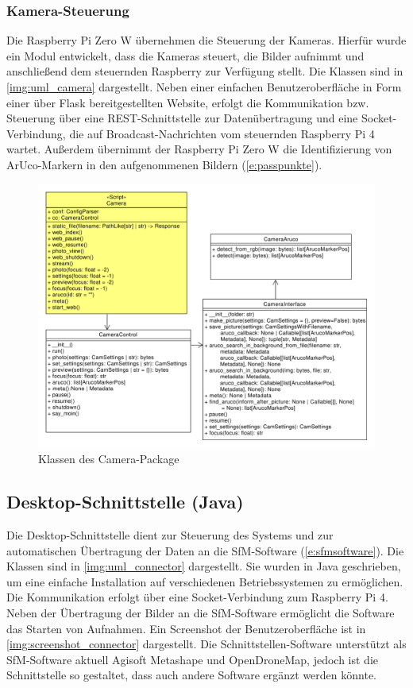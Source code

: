 \documentclass[./00PhotoBox.tex]{subfiles}
\begin{document}
\subsubsection{Kamera-Steuerung}
Die Raspberry Pi Zero W übernehmen die Steuerung der Kameras. Hierfür wurde ein Modul entwickelt, dass die Kameras steuert, die Bilder aufnimmt und anschließend dem steuernden Raspberry zur Verfügung stellt. Die Klassen sind in \autoref{img:uml_camera} dargestellt. Neben einer einfachen Benutzeroberfläche in Form einer über Flask bereitgestellten Website, erfolgt die Kommunikation bzw. Steuerung über eine REST-Schnittstelle zur Datenübertragung und eine Socket-Verbindung, die auf Broadcast-Nachrichten vom steuernden Raspberry Pi 4 wartet. Außerdem übernimmt der Raspberry Pi Zero W die Identifizierung von ArUco-Markern in den aufgenommenen Bildern (\autoref{e:passpunkte}).


\begin{figure}
  \centering
  \includegraphics[width=1\textwidth]{./img/uml/uml_camera_classdiagramm.pdf}
  \caption{Klassen des Camera-Package} %
  \label{img:uml_camera} %
\end{figure}


\subsection{Desktop-Schnittstelle (Java)}
Die Desktop-Schnittstelle dient zur Steuerung des Systems und zur automatischen Über\-tragung der Daten an die SfM-Software (\autoref{e:sfmsoftware}). Die Klassen sind in \autoref{img:uml_connector} dargestellt. Sie wurden in Java geschrieben, um eine einfache Installation auf verschiedenen Betriebssystemen zu ermöglichen. Die Kommunikation erfolgt über eine Socket-Verbindung zum Raspberry Pi 4. Neben der Übertragung der Bilder an die SfM-Software ermöglicht die Software das Starten von Aufnahmen. Ein Screenshot der Benutzeroberfläche ist in \autoref{img:screenshot_connector} dargestellt. Die Schnittstellen-Software unterstützt als SfM-Software aktuell Agisoft Metashape und OpenDroneMap, jedoch ist die Schnittstelle so gestaltet, dass auch andere Software ergänzt werden könnte.
\end{document}
